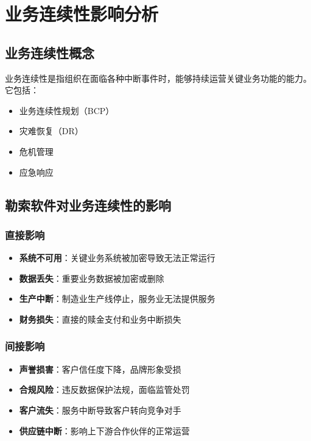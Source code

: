 \documentclass[12pt,a4paper]{article}
\begin{document}
\section{业务连续性影响分析}

\subsection{业务连续性概念}

业务连续性是指组织在面临各种中断事件时，能够持续运营关键业务功能的能力。它包括：
\begin{itemize}
    \item 业务连续性规划（BCP）
    \item 灾难恢复（DR）
    \item 危机管理
    \item 应急响应
\end{itemize}

\subsection{勒索软件对业务连续性的影响}

\subsubsection{直接影响}
\begin{itemize}
    \item \textbf{系统不可用}：关键业务系统被加密导致无法正常运行
    \item \textbf{数据丢失}：重要业务数据被加密或删除
    \item \textbf{生产中断}：制造业生产线停止，服务业无法提供服务
    \item \textbf{财务损失}：直接的赎金支付和业务中断损失
\end{itemize}

\subsubsection{间接影响}
\begin{itemize}
    \item \textbf{声誉损害}：客户信任度下降，品牌形象受损
    \item \textbf{合规风险}：违反数据保护法规，面临监管处罚
    \item \textbf{客户流失}：服务中断导致客户转向竞争对手
    \item \textbf{供应链中断}：影响上下游合作伙伴的正常运营
\end{itemize}
\end{document}
